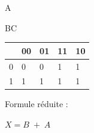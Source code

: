 \documentclass[11pt,a4paper]{article}
\begin{document}
\begin{table}[!ht]
  \centering
  \begin{minipage}{0.08\textwidth}
    \centering

\vfillFirst


A

\vfillLast

  \end{minipage}
  \hfillx
  \begin{minipage}{0.37\textwidth}
    \centering

\begin{center}


BC

\medskip

\begin{tabular}{|C{0.75cm} || C{0.75cm}|C{0.75cm}|C{0.75cm}|C{0.75cm}|}
\hline
{}  &   00 &  01 &  11 &  10 \\
\hline
\hline
{} 0 &  0 & 0 & 1 & 1 \\ \hline
{} 1 &  1 & 1 & 1 & 1 \\ \hline
\end{tabular}


\end{center}

  \end{minipage}
  \hfillx
  \begin{minipage}{0.55\textwidth}
    \centering

Formule réduite :

\vspace{2cm}

\vfillFirst

\phantom{42}

$ X = B \; + \; A $

\vfillLast

  \end{minipage}
\end{table}
\end{document}
